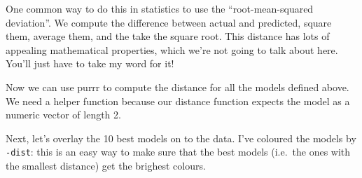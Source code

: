 \documentclass[]{book}
\newenvironment{Shaded}{\begin{snugshade}}{\end{snugshade}}
\newcommand{\KeywordTok}[1]{\textcolor[rgb]{0.13,0.29,0.53}{\textbf{{#1}}}}
\newcommand{\DataTypeTok}[1]{\textcolor[rgb]{0.13,0.29,0.53}{{#1}}}
\newcommand{\DecValTok}[1]{\textcolor[rgb]{0.00,0.00,0.81}{{#1}}}
\newcommand{\FloatTok}[1]{\textcolor[rgb]{0.00,0.00,0.81}{{#1}}}
\newcommand{\StringTok}[1]{\textcolor[rgb]{0.31,0.60,0.02}{{#1}}}
\newcommand{\CommentTok}[1]{\textcolor[rgb]{0.56,0.35,0.01}{\textit{{#1}}}}
\newcommand{\NormalTok}[1]{{#1}}
\begin{document}
One common way to do this in statistics to use the ``root-mean-squared
deviation''. We compute the difference between actual and predicted,
square them, average them, and the take the square root. This distance
has lots of appealing mathematical properties, which we're not going to
talk about here. You'll just have to take my word for it!

\begin{Shaded}
\end{Shaded}

Now we can use purrr to compute the distance for all the models defined
above. We need a helper function because our distance function expects
the model as a numeric vector of length 2.

\begin{Shaded}
\end{Shaded}

Next, let's overlay the 10 best models on to the data. I've coloured the
models by \texttt{-dist}: this is an easy way to make sure that the best
models (i.e.~the ones with the smallest distance) get the brighest
colours.
\end{document}
